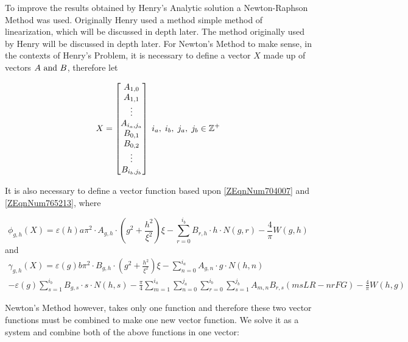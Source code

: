 To improve the results obtained by Henry's Analytic solution a Newton-Raphson Method was used.
Originally Henry used a method simple method of linearization, which will be discussed in depth
later. The method originally used by Henry will be discussed in depth later. For Newton's Method to
make sense, in the contexts of Henry's Problem, it is necessary to define a vector $X$ made up of
vectors $A \text{ and } B$, therefore let

\begin{equation} \label{4.1)} 
    X = \begin{bmatrix}
    A_{1,0} \\ 
    A_{1,1} \\ 
    \vdots \\ 
    A_{i_{a} ,j_{a} } \\ 
    B_{0,1} \\ 
    B_{0,2} \\ 
    \vdots \\
    B_{i_{b} ,j_{b} } \end{bmatrix} \; 
    i_{a} , \; i_{b} , \; j_{a} , \; j_{b} \in \mathbb{Z}^{+} 
\end{equation}

It is also necessary to define a vector function based upon
\eqref{ZEqnNum704007} and \eqref{ZEqnNum765213}, where

\begin{equation} \label{4.2)} 
    \phi _{g,h} \left(X\right) = \varepsilon \left(h \right) a \pi ^{2} 
    \cdot A_{g,h} \cdot \left(g^{2} + \frac{h^{2} }{\xi ^{2}} \right)
    \xi - \sum _{r=0}^{i_{b} }B_{r,h} \cdot h \cdot N\left(g,r\right)
    - \frac{4}{\pi } W\left(g,h\right) 
\end{equation} 
and
\begin{equation} \label{4.3)} \begin{array}{l} 
    \gamma _{g,h} \left(X\right) = \varepsilon \left(g \right) b \pi ^{2} 
    \cdot B_{g,h} \cdot \left(g^{2} + \frac{h^{2}}{\xi ^{2}} \right) \xi 
    - \sum _{n=0}^{i_{a} }A_{g,n} \cdot g \cdot N\left(h,n\right) \\ 
    - \varepsilon \left(g\right) \sum_{s=1}^{i_{b}} 
    B_{g,s} \cdot s \cdot N\left(h,s\right) - \frac{\pi}{4} 
    \sum_{m=1}^{i_{a}} \sum _{n=0}^{j_{a} } \sum _{r=0}^{i_{b}} \sum _{s=1}^{j_{b}} 
    A_{m,n} B_{r,s} \left(msLR - nrFG\right) - \frac{4}{\pi} W\left(h,g\right)
\end{array} \end{equation}

Newton's Method however, takes only one function and therefore these two vector
functions must be combined to make one new vector function. We solve it as a
system and combine both of the above functions in one vector:

